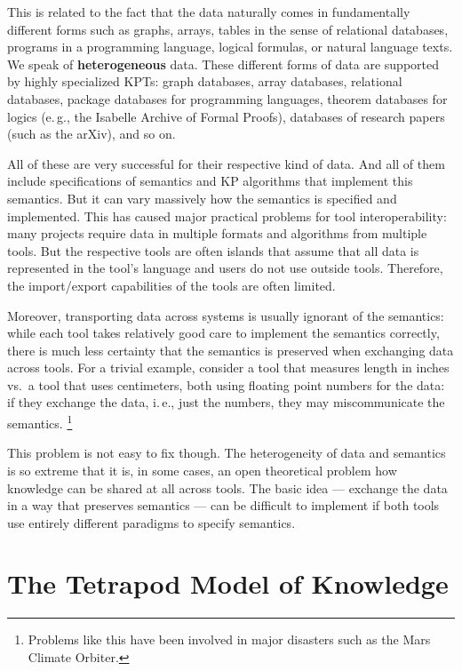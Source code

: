 This is related to the fact that the data naturally comes in fundamentally different forms such as graphs, arrays, tables in the sense of relational databases, programs in a programming language, logical formulas, or natural language texts.
We speak of \textbf{heterogeneous} data.
These different forms of data are supported by highly specialized KPTs: graph databases, array databases, relational databases, package databases for programming languages, theorem databases for logics (e.\,g., the Isabelle Archive of Formal Proofs), databases of research papers (such as the arXiv), and so on.

All of these are very successful for their respective kind of data.
And all of them include specifications of semantics and KP algorithms that implement this semantics.
But it can vary massively how the semantics is specified and implemented.
This has caused major practical problems for tool interoperability: many projects require data in multiple formats and algorithms from multiple tools.
But the respective tools are often islands that assume that all data is represented in the tool's language and users do not use outside tools.
Therefore, the import/export capabilities of the tools are often limited.

Moreover, transporting data across systems is usually ignorant of the semantics: while each tool takes relatively good care to implement the semantics correctly, there is much less certainty that the semantics is preserved when exchanging data across tools.
For a trivial example, consider a tool that measures length in inches vs.\ a tool that uses centimeters, both using floating point numbers for the data: if they exchange the data, i.\,e., just the numbers, they may miscommunicate the semantics.%
\footnote{Problems like this have been involved in major disasters such as the Mars Climate Orbiter.} 

This problem is not easy to fix though.
The heterogeneity of data and semantics is so extreme that it is, in some cases, an open theoretical problem how knowledge can be shared at all across tools.
The basic idea --- exchange the data in a way that preserves semantics --- can be difficult to implement if both tools use entirely different paradigms to specify semantics.

\section{The Tetrapod Model of Knowledge}

